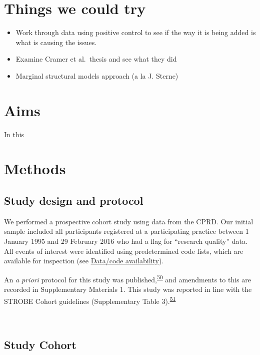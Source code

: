 \documentclass[a4paper, twoside]{templates/ociamthesis}
\providecommand{\tightlist}{%
  \setlength{\itemsep}{0pt}\setlength{\parskip}{0pt}}
\begin{document}
\hypertarget{things-we-could-try}{%
\section{Things we could try}\label{things-we-could-try}}

\begin{itemize}
\tightlist
\item
  Work through data using positive control to see if the way it is being added is what is causing the issues.
\item
  Examine Cramer et al.~thesis and see what they did
\item
  Marginal structural models approach (a la J. Sterne)
\end{itemize}

\hypertarget{aims-1}{%
\section{Aims}\label{aims-1}}

In this

\hypertarget{methods-1}{%
\section{Methods}\label{methods-1}}

\hypertarget{study-design-and-protocol}{%
\subsection{Study design and protocol}\label{study-design-and-protocol}}

We performed a prospective cohort study using data from the CPRD. Our initial sample included all participants registered at a participating practice between 1 January 1995 and 29 February 2016 who had a flag for ``research quality'' data. All events of interest were identified using predetermined code lists, which are available for inspection (see \protect\hyperlink{data-code-avail}{Data/code availability}).

An \emph{a priori} protocol for this study was published,\textsuperscript{\protect\hyperlink{ref-walker2016a}{50}} and amendments to this are recorded in Supplementary Materials 1. This study was reported in line with the STROBE Cohort guidelines (Supplementary Table 3).\textsuperscript{\protect\hyperlink{ref-vonelm2008}{51}}

~

\hypertarget{study-cohort}{%
\subsection{Study Cohort}\label{study-cohort}}
\end{document}
